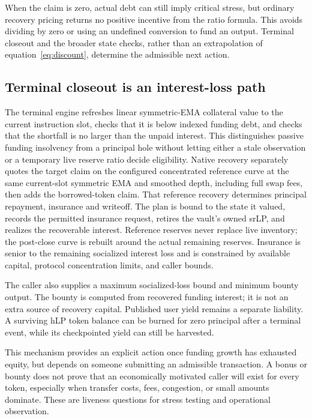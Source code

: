 When the claim is zero, actual debt can still imply critical stress, but ordinary recovery pricing returns no positive incentive from the ratio formula. This avoids dividing by zero or using an undefined conversion to fund an output. Terminal closeout and the broader state checks, rather than an extrapolation of equation~\eqref{eq:discount}, determine the admissible next action.

\subsection{Terminal closeout is an interest-loss path}

The terminal engine refreshes linear symmetric-EMA collateral value to the current instruction slot, checks that it is below indexed funding debt, and checks that the shortfall is no larger than the unpaid interest. This distinguishes passive funding insolvency from a principal hole without letting either a stale observation or a temporary live reserve ratio decide eligibility. Native recovery separately quotes the target claim on the configured concentrated reference curve at the same current-slot symmetric EMA and smoothed depth, including full swap fees, then adds the borrowed-token claim. That reference recovery determines principal repayment, insurance and writeoff. The plan is bound to the state it valued, records the permitted insurance request, retires the vault's owned srLP, and realizes the recoverable interest. Reference reserves never replace live inventory; the post-close curve is rebuilt around the actual remaining reserves. Insurance is senior to the remaining socialized interest loss and is constrained by available capital, protocol concentration limits, and caller bounds.

The caller also supplies a maximum socialized-loss bound and minimum bounty output. The bounty is computed from recovered funding interest; it is not an extra source of recovery capital. Published user yield remains a separate liability. A surviving hLP token balance can be burned for zero principal after a terminal event, while its checkpointed yield can still be harvested.

This mechanism provides an explicit action once funding growth has exhausted equity, but depends on someone submitting an admissible transaction. A bonus or bounty does not prove that an economically motivated caller will exist for every token, especially when transfer costs, fees, congestion, or small amounts dominate. These are liveness questions for stress testing and operational observation.


